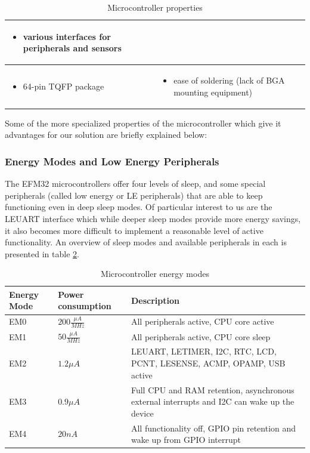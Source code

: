 \begin{table}[htb]
\begin{tabular}{|m{}|m{}|}
	\phantom{.}
	\begin{itemize}
	\item various interfaces for peripherals and sensors
	\end{itemize} \\
\hline
	\phantom{.}
	\begin{itemize}
	\item 64-pin TQFP package
	\end{itemize} &
	\phantom{.}
	\begin{itemize}
	\item ease of soldering (lack of BGA mounting equipment)
	\end{itemize} \\
\hline 
\end{tabular} 
\caption{Microcontroller properties}
\label{tab:microcontroller_properties}
\end{table}

Some of the more specialized properties of the microcontroller which give it advantages for our solution are briefly explained below:

\subsubsection*{Energy Modes and Low Energy Peripherals} The EFM32 microcontrollers offer four levels of sleep, and some special peripherals (called low energy or LE peripherals) that are able to keep functioning even in deep sleep modes. Of particular interest to us are the LEUART interface which while deeper sleep modes provide more energy savings, it also becomes more difficult to implement a reasonable level of active functionality. An overview of sleep modes and available peripherals in each is presented in table \ref{tab:microcontroller_modes}.

\begin{table}[htb]
\centering
\begin{tabular}{|l|l|m{6cm}|}
\hline
	\textbf{Energy Mode}&
	\textbf{Power consumption}&
	\textbf{Description}  \\ 
\hline
	EM0 &
	$200 \frac{\mu A}{MHz}$ &
	All peripherals active, CPU core active  \\ 
\hline
	EM1 &
	$50 \frac{\mu A}{MHz}$  &
	All peripherals active, CPU core sleep  \\ 
\hline
	EM2 &
	$1.2 \mu A$  &
	LEUART, LETIMER, I2C, RTC, LCD, PCNT, LESENSE, ACMP, OPAMP, USB active  \\ 
\hline
	EM3 &
	$0.9 \mu A$  &
	Full CPU and RAM retention, asynchronous external interrupts and I2C can wake up the device   \\ 
\hline
	EM4 &
	$20 nA$  &
	All functionality off, GPIO pin retention and wake up from GPIO interrupt  \\ 
\hline 
\end{tabular} 
\caption{Microcontroller energy modes}
\label{tab:microcontroller_modes}
\end{table}

